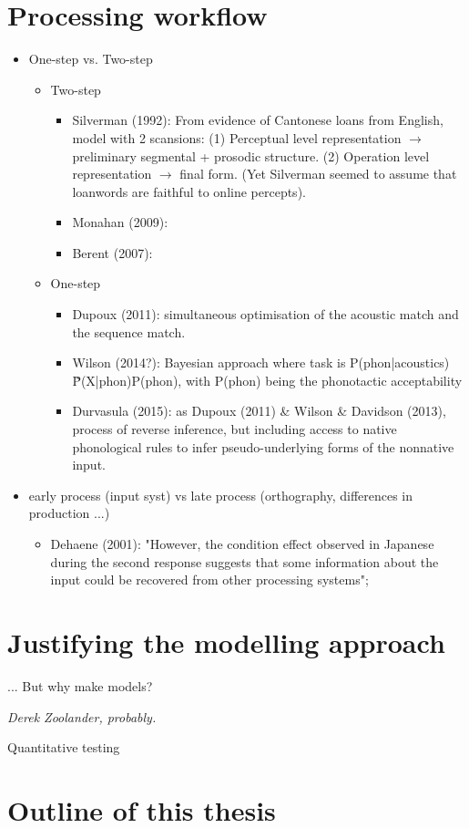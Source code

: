 \section{Processing workflow}
\begin{itemize}
\item One-step vs. Two-step
  \begin{itemize}
  \item Two-step
      \begin{itemize}
        \item Silverman (1992): From evidence of Cantonese loans from English, model with 2 scansions: (1) Perceptual level representation $\rightarrow$ preliminary segmental + prosodic structure. (2) Operation level representation $\rightarrow$ final form. (Yet Silverman seemed to assume that loanwords are faithful to online percepts).
        \item Monahan (2009):
        \item Berent (2007): 
      \end{itemize}
  \item One-step
      \begin{itemize}
         \item Dupoux (2011): simultaneous optimisation of the acoustic match and the sequence match.
         \item Wilson (2014?): Bayesian approach where task is P(phon|acoustics) \~ P(X|phon)P(phon), with P(phon) being the phonotactic acceptability 
         \item Durvasula (2015): as Dupoux (2011) \& Wilson \& Davidson (2013), process of reverse inference, but including access to native phonological rules to infer pseudo-underlying forms of the nonnative input.
      \end{itemize}  
  \end{itemize}
\item early process (input syst) vs late process (orthography, differences in production ...)
  \begin{itemize}
     \item Dehaene (2001): "However, the condition effect observed in Japanese during the second response suggests that some information about the input could be recovered from other processing systems";
  \end{itemize}  
\end{itemize}
    
\section{Justifying the modelling approach}
\epigraph{... But why make models?}{\textit{Derek Zoolander, probably.}}
Quantitative testing $~$

\section{Outline of this thesis}

